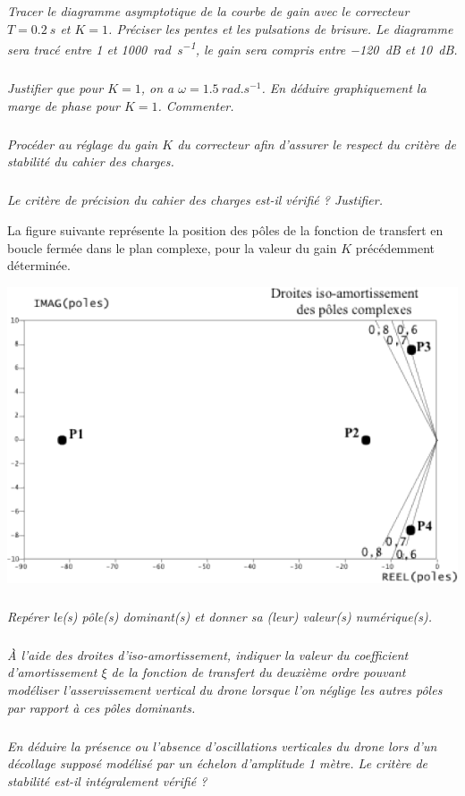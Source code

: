 \documentclass[10pt,fleqn]{article} %
\begin{document}
\begin{multicols}{2}
\subparagraph{}\textit{Tracer le diagramme asymptotique de la courbe de gain avec le correcteur $T=\SI{0,2}{s}$ et $K=1$.
Préciser les pentes et les pulsations de brisure. Le diagramme sera tracé entre 1 et \SI{1000}{rad.s^{-1}}, le gain sera compris entre \SI{-120}{dB} et \SI{+10}{dB}.}

\subparagraph{}\textit{Justifier que pour $K=1$, on a $\omega=\SI{1,5}{rad.s^{-1}}$. En déduire graphiquement la marge de phase pour
$K=1$. Commenter.}

\subparagraph{}\textit{Procéder au réglage du gain $K$ du correcteur afin d’assurer le respect du critère de stabilité du cahier des charges.}

\subparagraph{}\textit{Le critère de précision du cahier des charges est-il vérifié ? Justifier.}

La figure suivante représente la position des pôles de la fonction de transfert en boucle fermée dans le plan
complexe, pour la valeur du gain $K$ précédemment déterminée.


\begin{center}
\includegraphics[width=\linewidth]{images/fig_08}
\end{center}


\subparagraph{}\textit{Repérer le(s) pôle(s) dominant(s) et donner sa (leur) valeur(s) numérique(s).}

\subparagraph{}\textit{À l’aide des droites d’iso-amortissement, indiquer la valeur du coefficient d’amortissement $\xi$ de la
fonction de transfert du deuxième ordre pouvant modéliser l’asservissement vertical du drone lorsque
l’on néglige les autres pôles par rapport à ces pôles dominants.}

\subparagraph{}\textit{En déduire la présence ou l’absence d’oscillations verticales du drone lors d’un décollage supposé
modélisé par un échelon d’amplitude 1 mètre. Le critère de stabilité est-il intégralement vérifié ?}


\end{multicols}
\end{document}
